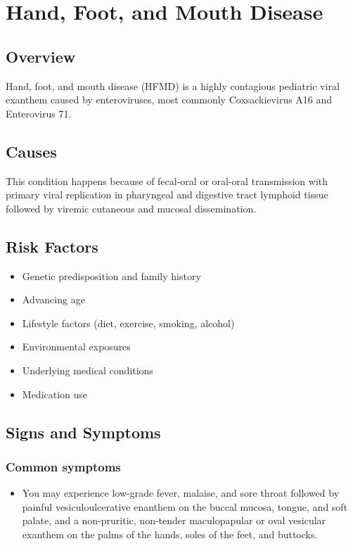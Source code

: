 \chapter{Hand, Foot, and Mouth Disease}
\label{sec:Hand, Foot, and Mouth Disease}

\section{Overview}
Hand, foot, and mouth disease (HFMD) is a highly contagious pediatric viral exanthem caused by enteroviruses, most commonly Coxsackievirus A16 and Enterovirus 71.
\section{Causes}
This condition happens because of fecal-oral or oral-oral transmission with primary viral replication in pharyngeal and digestive tract lymphoid tissue followed by viremic cutaneous and mucosal dissemination.     
\section{Risk Factors}

\begin{itemize}[noitemsep]
  \item Genetic predisposition and family history
  \item Advancing age
  \item Lifestyle factors (diet, exercise, smoking, alcohol)
  \item Environmental exposures
  \item Underlying medical conditions
  \item Medication use
\end{itemize}
\section{Signs and Symptoms}

\subsection{Common symptoms}
\begin{itemize}[noitemsep]
  \item You may experience low-grade fever, malaise, and sore throat followed by painful vesiculoulcerative enanthem on the buccal mucosa, tongue, and soft palate, and a non-pruritic, non-tender maculopapular or oval vesicular exanthem on the palms of the hands, soles of the feet, and buttocks. 
  \end{itemize}

